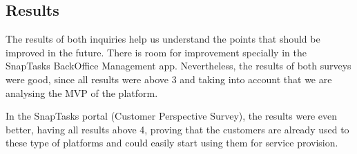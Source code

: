 \subsection{Results}
The results of both inquiries help us understand the points that should be improved in the future. There is room for improvement specially in the SnapTasks BackOffice Management app. Nevertheless, the results of both surveys were good, since all results were above 3 and taking into account that we are analysing the \gls{MVP} of the platform.
\par
In the SnapTasks portal (Customer Perspective Survey), the results were even better, having all results above 4, proving that the customers are already used to these type of platforms and could easily start using them for service provision.


